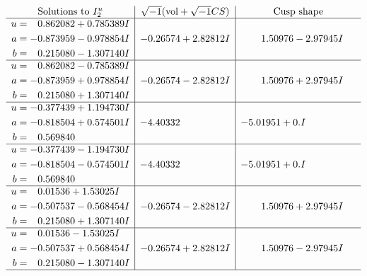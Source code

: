 \documentclass[1p]{elsarticle_modified}
\theoremstyle{definition}
\newcommand{\I}{\sqrt{-1}}
\begin{document}
$$\begin{array}{c|c|c}  
\text{Solutions to }I^u_{2}& \I (\text{vol} + \sqrt{-1}CS) & \text{Cusp shape}\\
 \hline 
\begin{aligned}
u &= \phantom{-}0.862082 + 0.785389 I \\
a &= -0.873959 - 0.978854 I \\
b &= \phantom{-}0.215080 - 1.307140 I\end{aligned}
 & -0.26574 + 2.82812 I & \phantom{-}1.50976 - 2.97945 I \\ \hline\begin{aligned}
u &= \phantom{-}0.862082 - 0.785389 I \\
a &= -0.873959 + 0.978854 I \\
b &= \phantom{-}0.215080 + 1.307140 I\end{aligned}
 & -0.26574 - 2.82812 I & \phantom{-}1.50976 + 2.97945 I \\ \hline\begin{aligned}
u &= -0.377439 + 1.194730 I \\
a &= -0.818504 + 0.574501 I \\
b &= \phantom{-}0.569840\phantom{ +0.000000I}\end{aligned}
 & -4.40332\phantom{ +0.000000I} & -5.01951 + 0. I\phantom{ +0.000000I} \\ \hline\begin{aligned}
u &= -0.377439 - 1.194730 I \\
a &= -0.818504 - 0.574501 I \\
b &= \phantom{-}0.569840\phantom{ +0.000000I}\end{aligned}
 & -4.40332\phantom{ +0.000000I} & -5.01951 + 0. I\phantom{ +0.000000I} \\ \hline\begin{aligned}
u &= \phantom{-}0.01536 + 1.53025 I \\
a &= -0.507537 - 0.568454 I \\
b &= \phantom{-}0.215080 + 1.307140 I\end{aligned}
 & -0.26574 - 2.82812 I & \phantom{-}1.50976 + 2.97945 I \\ \hline\begin{aligned}
u &= \phantom{-}0.01536 - 1.53025 I \\
a &= -0.507537 + 0.568454 I \\
b &= \phantom{-}0.215080 - 1.307140 I\end{aligned}
 & -0.26574 + 2.82812 I & \phantom{-}1.50976 - 2.97945 I\\
 \hline 
 \end{array}$$\newpage\newpage\renewcommand{\arraystretch}{1}
\end{document}
